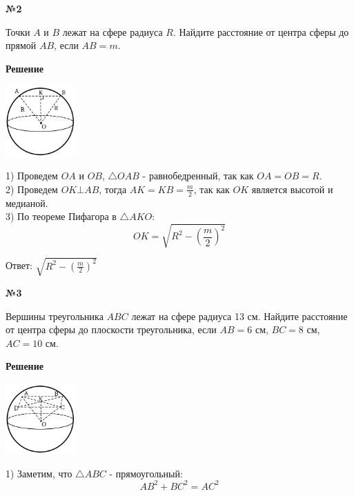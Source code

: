     \begin{center}
        \textbf{№2}
    \end{center}

    Точки $A$ и $B$ лежат на сфере радиуса $R$.
    Найдите расстояние от центра сферы до прямой $AB$, если $AB = m$.

    \textbf{Решение}\\
    \begin{center}
        \includegraphics[width=0.2\textwidth]{images/img1}\\
    \end{center}

    1) Проведем $OA$ и $OB$, $\triangle OAB$ - равнобедренный, так как $OA = OB = R$.\\

    2) Проведем $OK \bot AB$, тогда $AK = KB = \frac{m}{2}$, так как $OK$ является высотой и медианой.\\

    3) По теореме Пифагора в $\triangle AKO:$
    \[
        OK = \sqrt {R ^ 2 - \left(\frac{m}{2}\right)^2}
    \]

    Ответ: $\sqrt {R ^ 2 - \left(\frac{m}{2}\right)^2}$

    \begin{center}
        \textbf{№3}
    \end{center}

    Вершины треугольника $ABC$ лежат на сфере радиуса 13 см.
    Найдите расстояние от центра сферы до плоскости треугольника, если $AB = 6$ см, $BC = 8$ см, $AC = 10$ см.

    \textbf{Решение}\\

    \begin{center}
        \includegraphics[width=0.2\textwidth]{images/img2}\\
    \end{center}
    1) Заметим, что $\triangle ABC$ - прямоугольный:
    \[ AB ^ 2 + BC ^ 2 = AC ^ 2 \]

